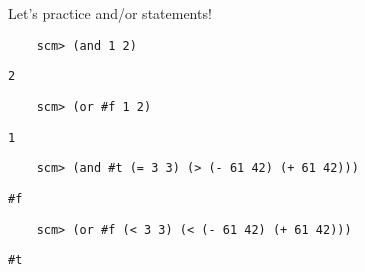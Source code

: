 \begin{blocksection}
Let's practice and/or statements!

\begin{lstlisting}
    scm> (and 1 2)
\end{lstlisting}
\begin{solution}[.25in]
    \texttt{2}
\end{solution}

\begin{lstlisting}
    scm> (or #f 1 2)
\end{lstlisting}
\begin{solution}[.25in]
    \texttt{1}
\end{solution}

\begin{lstlisting}
    scm> (and #t (= 3 3) (> (- 61 42) (+ 61 42)))
\end{lstlisting}
\begin{solution}[.25in]
    \texttt{\#f}
\end{solution}

\begin{lstlisting}
    scm> (or #f (< 3 3) (< (- 61 42) (+ 61 42)))
\end{lstlisting}
\begin{solution}[.25in]
    \texttt{\#t}
\end{solution}
\end{blocksection}